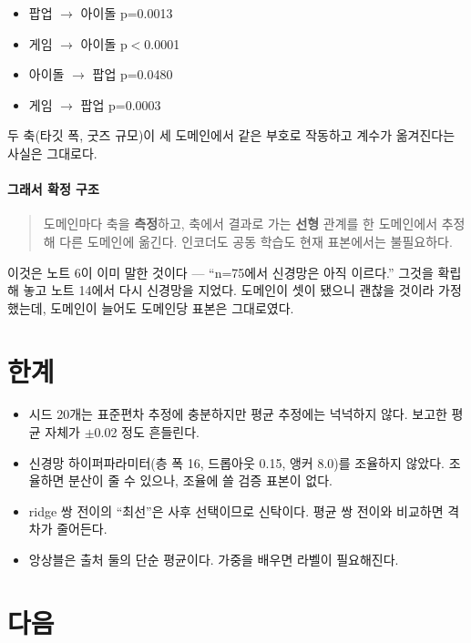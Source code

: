 \documentclass[10pt]{article}
\begin{document}
\begin{itemize}[leftmargin=1.1em,itemsep=0.15em]
\item 팝업 $\to$ 아이돌 p=0.0013
\item 게임 $\to$ 아이돌 p$<$0.0001
\item 아이돌 $\to$ 팝업 p=0.0480
\item 게임 $\to$ 팝업 p=0.0003
\end{itemize}

두 축(타깃 폭, 굿즈 규모)이 세 도메인에서 같은 부호로 작동하고 계수가 옮겨진다는
사실은 그대로다.

\paragraph{그래서 확정 구조}
\begin{quote}\fontsize{9.5}{11.5}\selectfont
도메인마다 축을 \textbf{측정}하고, 축에서 결과로 가는 \textbf{선형} 관계를 한
도메인에서 추정해 다른 도메인에 옮긴다. 인코더도 공동 학습도 현재 표본에서는
불필요하다.
\end{quote}

이것은 노트 6이 이미 말한 것이다 --- ``n=75에서 신경망은 아직 이르다.'' 그것을
확립해 놓고 노트 14에서 다시 신경망을 지었다. 도메인이 셋이 됐으니 괜찮을 것이라
가정했는데, 도메인이 늘어도 도메인당 표본은 그대로였다.

\section{한계}

\begin{itemize}[leftmargin=1.1em,itemsep=0.15em]
\item 시드 20개는 표준편차 추정에 충분하지만 평균 추정에는 넉넉하지 않다.
      보고한 평균 자체가 $\pm$0.02 정도 흔들린다.
\item 신경망 하이퍼파라미터(층 폭 16, 드롭아웃 0.15, 앵커 8.0)를 조율하지 않았다.
      조율하면 분산이 줄 수 있으나, 조율에 쓸 검증 표본이 없다.
\item ridge 쌍 전이의 ``최선''은 사후 선택이므로 신탁이다. 평균 쌍 전이와 비교하면
      격차가 줄어든다.
\item 앙상블은 출처 둘의 단순 평균이다. 가중을 배우면 라벨이 필요해진다.
\end{itemize}

\section{다음}
\end{document}
